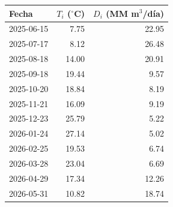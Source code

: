 \begin{tabular}{l r r}
\toprule
Fecha & $T_i$ ($^\circ$C) & $D_i$ (MM m$^3$/día) \\
\midrule
2025-06-15 & \num{7.75} & \num{22.95} \\
2025-07-17 & \num{8.12} & \num{26.48} \\
2025-08-18 & \num{14.00} & \num{20.91} \\
2025-09-18 & \num{19.44} & \num{9.57} \\
2025-10-20 & \num{18.84} & \num{8.19} \\
2025-11-21 & \num{16.09} & \num{9.19} \\
2025-12-23 & \num{25.79} & \num{5.22} \\
2026-01-24 & \num{27.14} & \num{5.02} \\
2026-02-25 & \num{19.53} & \num{6.74} \\
2026-03-28 & \num{23.04} & \num{6.69} \\
2026-04-29 & \num{17.34} & \num{12.26} \\
2026-05-31 & \num{10.82} & \num{18.74} \\
\bottomrule
\end{tabular}
